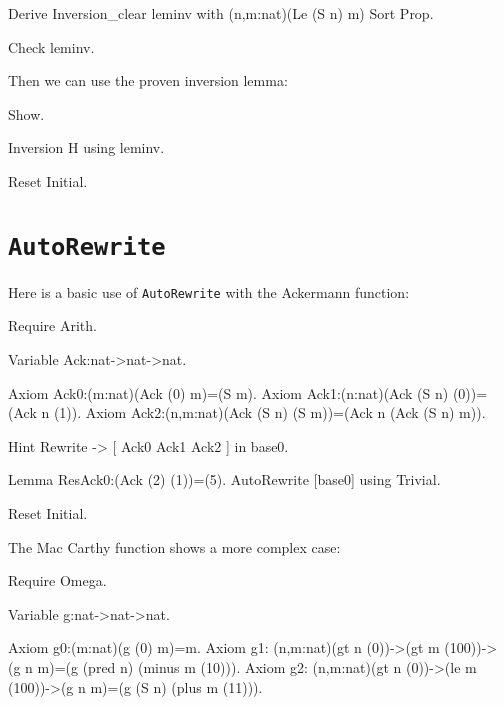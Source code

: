 \begin{coq_example*}
\begin{coq_example*}
Derive Inversion_clear leminv with (n,m:nat)(Le (S n) m) Sort Prop.
\end{coq_example*}

\begin{coq_example}
Check leminv.
\end{coq_example}

Then we can use the proven inversion lemma:

\begin{coq_example}
Show.
\end{coq_example}

\begin{coq_example}
Inversion H using leminv.
\end{coq_example}

\begin{coq_eval}
Reset Initial.
\end{coq_eval}

\section{\tt AutoRewrite}
\label{AutoRewrite-example}

\Example
Here is a basic use of {\tt AutoRewrite} with the Ackermann function:

\begin{coq_example*}
Require Arith.

Variable Ack:nat->nat->nat.

Axiom Ack0:(m:nat)(Ack (0) m)=(S m).
Axiom Ack1:(n:nat)(Ack (S n) (0))=(Ack n (1)).
Axiom Ack2:(n,m:nat)(Ack (S n) (S m))=(Ack n (Ack (S n) m)).
\end{coq_example*}

\begin{coq_example}
Hint Rewrite -> [ Ack0 Ack1 Ack2 ] in base0.

Lemma ResAck0:(Ack (2) (1))=(5).
AutoRewrite [base0] using Trivial.
\end{coq_example}

\begin{coq_eval}
Reset Initial.  
\end{coq_eval}

\Example
The Mac Carthy function shows a more complex case:

\begin{coq_example*}
Require Omega.

Variable g:nat->nat->nat.

Axiom g0:(m:nat)(g (0) m)=m.
Axiom g1:
  (n,m:nat)(gt n (0))->(gt m (100))->
  (g n m)=(g (pred n) (minus m (10))).
Axiom g2:
  (n,m:nat)(gt n (0))->(le m (100))->(g n m)=(g (S n) (plus m (11))).
\end{coq_example*}


\end{coq_example*}
